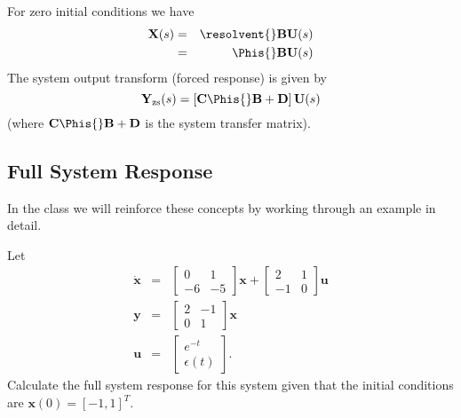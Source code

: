 \begin{slide} \label{slide:l4s11}
For zero initial conditions we have
\begin{eqnarray}\label{eq:l4eq6}
  \mathbf{X}(s)&=&\resolvent{}\mathbf{B}\mathbf{U}(s) \\
&=& \Phis{}\mathbf{B}\mathbf{U}(s) \label{eq:l4eq7}
\end{eqnarray}
The system output transform (forced response) is given by
\begin{equation}\label{eq:l4eq8}
 \mathbf{Y}_{\mathrm{zs}}(s)=\left[\mathbf{C}\Phis{}\mathbf{B}+\mathbf{D}\right]\mathbf{U}(s)
\end{equation} (where $\mathbf{C}\Phis{}\mathbf{B}+\mathbf{D}$ is the system transfer
matrix).
\end{slide}

\subsection*{Full System Response}
\ifslidesonly
\begin{slide}

\end{slide}
\fi

\ifslidesonly
\begin{slide}
In the class we will reinforce these concepts by working through an example in detail.
\end{slide}
\fi
\begin{slide}\label{slide:l4s12}
 Let
\begin{eqnarray*}\dot{\mathbf{x}}&=&\left[\begin{array}{cc}
  0 & 1 \\
  -6 & -5
\end{array}\right]\mathbf{x}+\left[\begin{array}{cc}
  2 & 1 \\
 -1 & 0
\end{array}\right]\mathbf{u}\\
\mathbf{y}&=&\left[\begin{array}{cc}
  2 & -1 \\
  0 & 1
\end{array}\right]\mathbf{x}\\ \mathbf{u}&=&\left[\begin{array}{c}
  e^{-t} \\
  \epsilon(t)
\end{array}\right].
\end{eqnarray*}
Calculate the full system response for this system given that the initial conditions
are $\mathbf{x}(0)=[-1, 1]^T$.
\end{slide}

